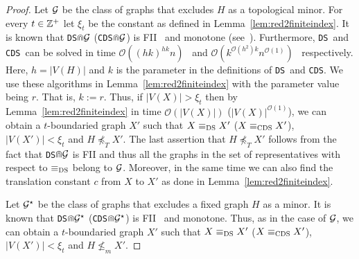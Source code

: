 \documentclass[11pt]{article}
\newcommand{\tDS}{{\texttt{\sc DS}}}
\newcommand{\tCDS}{{\texttt{\sc CDS}}}
\newcommand{\cO}{\mathcal{O}}
\begin{document}
\begin{proof}
Let $\cal G$ be the class of  graphs that excludes $H$ as a topological minor. 
For every $t\in\Bbb{Z}^{+}$ let $\xi_t$ be the constant as defined in Lemma~\ref{lem:red2finiteindex}. It is known 
that  \tDS$\doublecap {\cal G}$ (\tCDS $\doublecap {\cal G}$) is FII\cal~\cite{H.Bodlaender:2009ng} and monotone (see~\cite[Lemmas 7.3 and 7.4]{H.Bodlaender:2009ng}). Furthermore, \tDS \, and \tCDS \, can be solved in time  $\cO((hk)^{hk} n)$~\cite[Theorem 4]{AlonG09} 
and  $\cO(k^{\cO(h^2)k} n^{\cO(1)})$~\cite[Theorem 1]{GolovachV08}  respectively.  Here, $h=|V(H)|$ and $k$ is the parameter in the definitions of  \tDS \, and \tCDS. We  use these algorithms in Lemma~\ref{lem:red2finiteindex} with the parameter value being $r$. That is, $k:=r$. 
Thus, if $|V(X)|>\xi_t$  then 
by  Lemma~\ref{lem:red2finiteindex} in time  $\cO(|V(X)|)$  ($|V(X)|^{\cO(1)}$), we can obtain a 
$t$-boundaried graph $X'$  such that $X\equiv_{\tDS}X'$ ($X\equiv_{\tCDS}X'$),  $|V(X')| < \xi_t$ and 
$H\not\preceq_T X'$.   The last assertion that  $H\not\preceq_T X'$ follows from the fact that  \tDS$\doublecap {\cal G}$ is FII and thus all the graphs in the set of representatives with respect to $\equiv_{\tDS}$ belong to ${\cal G}$. 
Moreover, in the same time 
we can also find the translation constant $c$ from $X$  to $X'$ as done in Lemma~\ref{lem:red2finiteindex}. 

Let ${\cal G}^\star$  be the class of  graphs that excludes a fixed graph $H$ as a minor. It is known 
that  \tDS$\doublecap {\cal G}^\star$ (\tCDS $\doublecap {\cal G}^\star$) is FII\cal~\cite{H.Bodlaender:2009ng} and monotone. Thus, as in the case of $\cal G$, we can  obtain a 
$t$-boundaried graph $X'$  such that $X\equiv_{\tDS}X'$ ($X\equiv_{\tCDS}X'$),  $|V(X')| < \xi_t$ and 
$H\not\leq_m X'$.
\end{proof}







\begin{center}
  \end{center}
\end{document}
